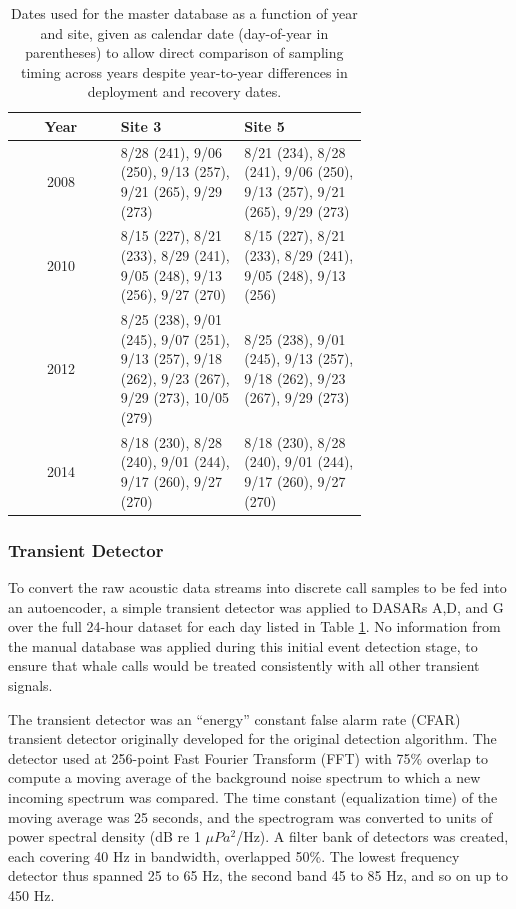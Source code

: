 \documentclass[preprint,NumberedRefs]{JASAnew}
\begin{document}
\begin{table}[ht]
    \centering
    \caption{Dates used for the master database as a function of year and
    site, given as calendar date (day-of-year in parentheses) to allow
    direct comparison of sampling timing across years despite
    year-to-year differences in deployment and recovery dates.}
    \label{tab:training_dates}
    \begin{tabular}{|c|p{0.35\linewidth}|p{0.35\linewidth}|}
        \hline
        Year & Site 3 & Site 5 \\
        \hline
        2008 &
        8/28 (241), 9/06 (250), 9/13 (257), 9/21 (265), 9/29 (273) &
        8/21 (234), 8/28 (241), 9/06 (250), 9/13 (257), 9/21 (265),
        9/29 (273) \\
        2010 &
        8/15 (227), 8/21 (233), 8/29 (241), 9/05 (248), 9/13 (256),
        9/27 (270) &
        8/15 (227), 8/21 (233), 8/29 (241), 9/05 (248), 9/13 (256) \\
        2012 &
        8/25 (238), 9/01 (245), 9/07 (251), 9/13 (257), 9/18 (262),
        9/23 (267), 9/29 (273), 10/05 (279) &
        8/25 (238), 9/01 (245), 9/13 (257), 9/18 (262), 9/23 (267),
        9/29 (273) \\
        2014 &
        8/18 (230), 8/28 (240), 9/01 (244), 9/17 (260), 9/27 (270) &
        8/18 (230), 8/28 (240), 9/01 (244), 9/17 (260), 9/27 (270) \\
        \hline
    \end{tabular}
\end{table}

\subsubsection{\label{sec:EventDetection}Transient Detector}

To convert the raw acoustic data streams into discrete call samples to be fed into an autoencoder, a simple transient detector was applied to DASARs A,D, and G over the full 24-hour dataset for each day listed in Table \ref{tab:training_dates}.  No information from the manual database was applied during this initial event detection stage, to ensure that whale calls would be treated consistently with all other transient signals.

The transient detector was an “energy” constant false alarm rate (CFAR) transient detector originally developed for the original detection algorithm\cite{thode2012automated}.  The detector used at 256-point Fast Fourier Transform (FFT) with 75\% overlap to compute a moving average of the background noise spectrum to which a new incoming spectrum was compared.  The time constant (equalization time) of the moving average was 25 seconds, and the spectrogram was converted to units of power spectral density (dB re 1 $\mu Pa^2$/Hz).   A filter bank of detectors was created, each covering 40 Hz in bandwidth, overlapped 50\%.  The lowest frequency detector thus spanned 25 to 65 Hz, the second band 45 to 85 Hz, and so on up to 450 Hz.  
\end{document}
